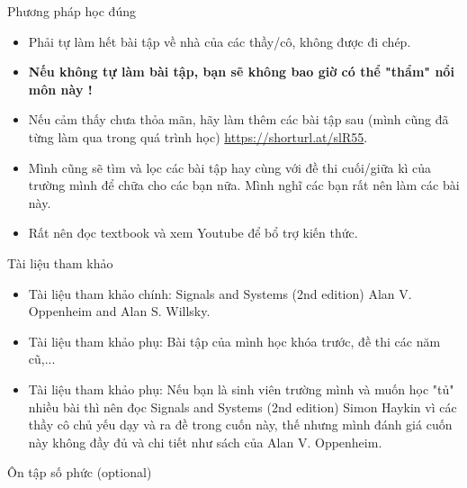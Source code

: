 \documentclass[8pt]{beamer}
\begin{document}
\begin{frame}{Phương pháp học đúng}
	\begin{itemize}
		\item \alert{Phải tự làm hết bài tập về nhà của các thầy/cô, không được đi chép.}
		\item \textbf{Nếu không tự làm bài tập, bạn sẽ không bao giờ có thể "thẩm" nổi môn này !}
		\item Nếu cảm thấy chưa thỏa mãn, hãy làm thêm các bài tập sau (mình cũng đã từng làm qua trong quá trình học) \url{https://shorturl.at/slR55}.
		\item Mình cũng sẽ tìm và lọc các bài tập hay cùng với đề thi cuối/giữa kì của trường mình để chữa cho các bạn nữa. Mình nghĩ các bạn rất nên làm các bài này.
		\item Rất nên đọc textbook và xem Youtube để bổ trợ kiến thức.
	\end{itemize}
\end{frame}
\begin{frame}{Tài liệu tham khảo}
	\begin{itemize}
		\item Tài liệu tham khảo chính: Signals and Systems (2nd edition) Alan V. Oppenheim and Alan S. Willsky.
		\item Tài liệu tham khảo phụ: Bài tập của mình học khóa trước, đề thi các năm cũ,...
		\item Tài liệu tham khảo phụ: Nếu bạn là sinh viên trường mình và muốn học "tủ" nhiều bài thì nên đọc Signals and Systems (2nd edition) Simon Haykin vì các thầy cô chủ yếu dạy và ra đề trong cuốn này, thế nhưng mình đánh giá cuốn này không đầy đủ và chi tiết như sách của Alan V. Oppenheim. 
	\end{itemize}
\end{frame}
\begin{frame}{Ôn tập số phức (optional)}
\end{frame}
\end{document}
